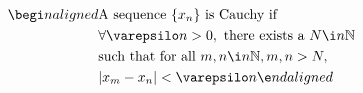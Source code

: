 \documentclass[preview]{standalone}
\begin{document}
\begin{align*}
\begi n {alig n ed}&\text{A  sequence  } \{ x_n \} \text{ is Cauchy if } \\ &\forall \varepsilo n  > 0, \text{ there exists a }  N  \i n   \mathbb{N}  \\ &\text{such that for all }  m ,  n  \i n   \mathbb{N} ,  m ,  n  >  N , \\ &| x_m - x_n | < \varepsilo n \e n d{alig n ed}
\end{align*}
\end{document}
